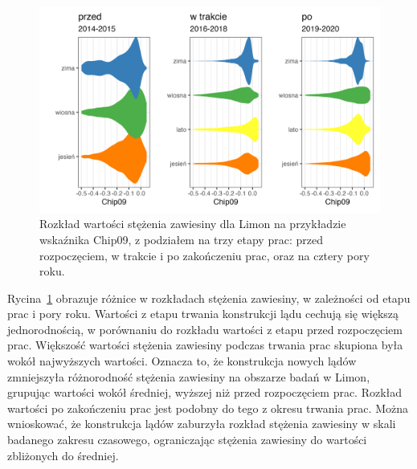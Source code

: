 \documentclass{amuthesis}
\begin{document}
\begin{figure}[t]

{\centering \includegraphics[width=6.25in,height=\textheight]{figures/costarica/chip_violin.png}

}

\caption{\label{fig-cr_chip_violin}Rozkład wartości stężenia zawiesiny
dla Limon na przykładzie wskaźnika Chip09, z podziałem na trzy etapy
prac: przed rozpoczęciem, w trakcie i po zakończeniu prac, oraz na
cztery pory roku.}

\end{figure}

Rycina~\ref{fig-cr_chip_violin} obrazuje różnice w rozkładach stężenia
zawiesiny, w zależności od etapu prac i pory roku. Wartości z etapu
trwania konstrukcji lądu cechują się większą jednorodnością, w
porównaniu do rozkładu wartości z etapu przed rozpoczęciem prac.
Większość wartości stężenia zawiesiny podczas trwania prac skupiona była
wokół najwyższych wartości. Oznacza to, że konstrukcja nowych lądów
zmniejszyła różnorodność stężenia zawiesiny na obszarze badań w Limon,
grupując wartości wokół średniej, wyższej niż przed rozpoczęciem prac.
Rozkład wartości po zakończeniu prac jest podobny do tego z okresu
trwania prac. Można wnioskować, że konstrukcja lądów zaburzyła rozkład
stężenia zawiesiny w skali badanego zakresu czasowego, ograniczając
stężenia zawiesiny do wartości zbliżonych do średniej.
\end{document}
